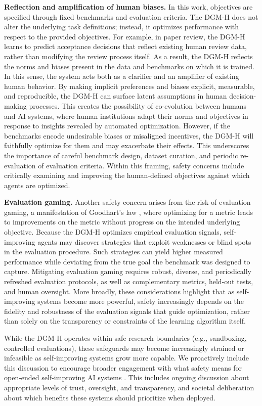 \documentclass{article}
\begin{document}
\textbf{Reflection and amplification of human biases.}
In this work, objectives are specified through fixed benchmarks and evaluation criteria. The DGM-H does not alter the underlying task definitions; instead, it optimizes performance with respect to the provided objectives. For example, in paper review, the DGM-H learns to predict acceptance decisions that reflect existing human review data, rather than modifying the review process itself. As a result, the DGM-H reflects the norms and biases present in the data and benchmarks on which it is trained. In this sense, the system acts both as a clarifier and an amplifier of existing human behavior. By making implicit preferences and biases explicit, measurable, and reproducible, the DGM-H can surface latent assumptions in human decision-making processes. This creates the possibility of co-evolution between humans and AI systems, where human institutions adapt their norms and objectives in response to insights revealed by automated optimization. However, if the benchmarks encode undesirable biases or misaligned incentives, the DGM-H will faithfully optimize for them and may exacerbate their effects. This underscores the importance of careful benchmark design, dataset curation, and periodic re-evaluation of evaluation criteria. Within this framing, safety concerns include critically examining and improving the human-defined objectives against which agents are optimized.

\textbf{Evaluation gaming.}
Another safety concern arises from the risk of evaluation gaming, a manifestation of Goodhart's law \citep{strathern1997improving}, where optimizing for a metric leads to improvements on the metric without progress on the intended underlying objective. Because the DGM-H optimizes empirical evaluation signals, self-improving agents may discover strategies that exploit weaknesses or blind spots in the evaluation procedure. Such strategies can yield higher measured performance while deviating from the true goal the benchmark was designed to capture. Mitigating evaluation gaming requires robust, diverse, and periodically refreshed evaluation protocols, as well as complementary metrics, held-out tests, and human oversight. More broadly, these considerations highlight that as self-improving systems become more powerful, safety increasingly depends on the fidelity and robustness of the evaluation signals that guide optimization, rather than solely on the transparency or constraints of the learning algorithm itself.

While the DGM-H operates within safe research boundaries (e.g., sandboxing, controlled evaluations), these safeguards may become increasingly strained or infeasible as self-improving systems grow more capable. We proactively include this discussion to encourage broader engagement with what safety means for open-ended self-improving AI systems \citep{clune2019ai, ecoffet2020open, sheth2025safety}. This includes ongoing discussion about appropriate levels of trust, oversight, and transparency, and societal deliberation about which benefits these systems should prioritize when deployed.

\newpage

\end{document}
